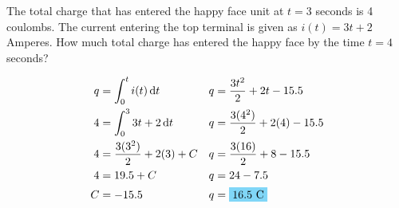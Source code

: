 The total charge that has entered the happy face unit at $t=3$ seconds is 4 coulombs. The current entering the top terminal is given as $i(t)=3t+2$ Amperes. How much total charge has entered the happy face by the time $t=4$ seconds?

\begin{align*}
	q&=\int_{0}^{t}i(t)\,\mathrm{d}t & q&=\frac{3t^2}{2}+2t-15.5\\
	4&=\int_{0}^{3}3t+2\,\mathrm{d}t & q&=\frac{3(4^2)}{2}+2(4)-15.5\\
	4&=\frac{3(3^2)}{2}+2(3)+C 		 & q&=\frac{3(16)}{2}+8-15.5\\
	4&=19.5+C 						 & q&=24-7.5 \\
	C&=-15.5  						 & q&=\hlbox{16.5 C}
\end{align*}